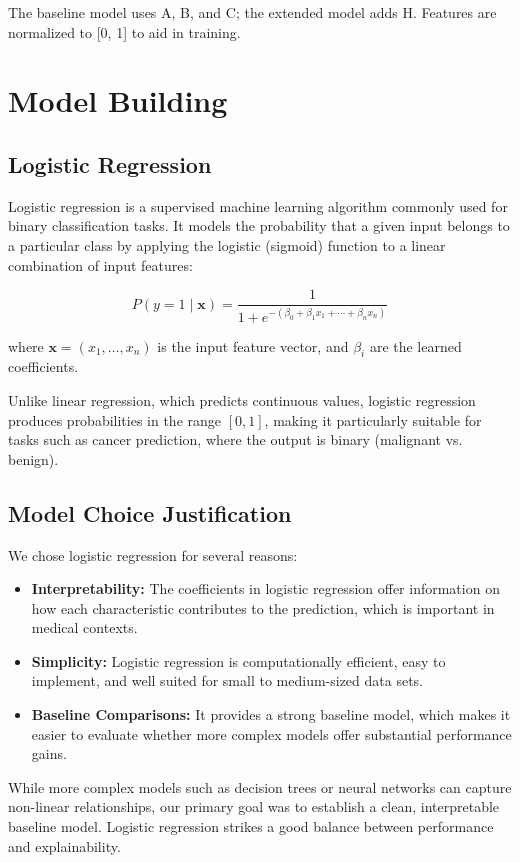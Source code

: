 \documentclass[10pt,twocolumn]{article}
\begin{document}
The baseline model uses A, B, and C; the extended model adds H. Features are normalized to [0, 1] to aid in training.

\section{Model Building}
\subsection{Logistic Regression}

Logistic regression is a supervised machine learning algorithm commonly used for binary classification tasks. It models the probability that a given input belongs to a particular class by applying the logistic (sigmoid) function to a linear combination of input features:

\[
P(y = 1 \mid \mathbf{x}) = \frac{1}{1 + e^{-(\beta_0 + \beta_1 x_1 + \cdots + \beta_n x_n)}}
\]

where \( \mathbf{x} = (x_1, \ldots, x_n) \) is the input feature vector, and \( \beta_i \) are the learned coefficients.

Unlike linear regression, which predicts continuous values, logistic regression produces probabilities in the range \([0, 1]\), making it particularly suitable for tasks such as cancer prediction, where the output is binary (malignant vs. benign).

\subsection{Model Choice Justification}

We chose logistic regression for several reasons:
\begin{itemize}
    \item \textbf{Interpretability:} The coefficients in logistic regression offer information on how each characteristic contributes to the prediction, which is important in medical contexts.
    \item \textbf{Simplicity:} Logistic regression is computationally efficient, easy to implement, and well suited for small to medium-sized data sets.
    \item \textbf{Baseline Comparisons:} It provides a strong baseline model, which makes it easier to evaluate whether more complex models offer substantial performance gains.
\end{itemize}

While more complex models such as decision trees or neural networks can capture non-linear relationships, our primary goal was to establish a clean, interpretable baseline model. Logistic regression strikes a good balance between performance and explainability.
\end{document}
